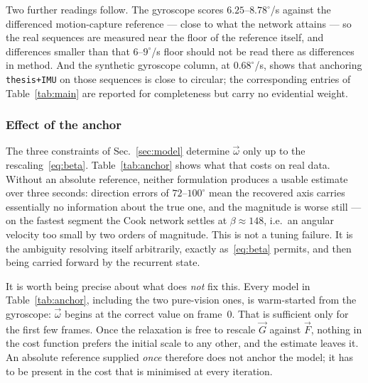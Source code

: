 \documentclass[journal]{IEEEtran}
\newcommand{\Gmap}{\vec{G}}
\newcommand{\Fmap}{\vec{F}}
\newcommand{\wvec}{\vec{\omega}}
\begin{document}
Two further readings follow. The gyroscope scores $6.25$--$8.78^\circ$/s
against the differenced motion-capture reference --- close to what the network
attains --- so the real sequences are measured near the floor of the reference
itself, and differences smaller than that $6$--$9^\circ$/s floor should not be
read there as differences in method.
And the synthetic gyroscope column, at $0.68^\circ$/s, shows that anchoring
\texttt{thesis+IMU} on those sequences is close to circular; the corresponding
entries of Table~\ref{tab:main} are reported for completeness but carry no
evidential weight.

\subsubsection{Effect of the anchor}
\label{sec:beta_exp}

The three constraints of Sec.~\ref{sec:model} determine $\wvec$ only up to the
rescaling~\eqref{eq:beta}. Table~\ref{tab:anchor} shows what that costs on real
data. Without an absolute reference, neither formulation produces a usable
estimate over three seconds: direction errors of $72$--$100^\circ$ mean the
recovered axis carries essentially no information about the true one, and the
magnitude is worse still --- on the fastest segment the Cook network settles at
$\beta \approx 148$, i.e.\ an angular velocity too small by two orders of
magnitude. This is not a tuning failure. It is the ambiguity resolving itself
arbitrarily, exactly as~\eqref{eq:beta} permits, and then being carried forward
by the recurrent state.

It is worth being precise about what does \emph{not} fix this. Every model in
Table~\ref{tab:anchor}, including the two pure-vision ones, is warm-started from
the gyroscope: $\wvec$ begins at the correct value on frame~0. That is
sufficient only for the first few frames. Once the relaxation is free to rescale
$\Gmap$ against $\Fmap$, nothing in the cost function prefers the initial scale
to any other, and the estimate leaves it. An absolute reference supplied
\emph{once} therefore does not anchor the model; it has to be present in the
cost that is minimised at every iteration.
\end{document}
